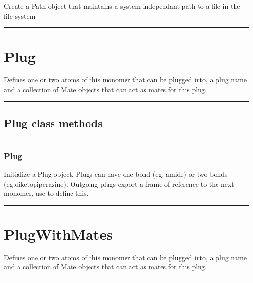 \begin{itemize}
Create a Path object that maintains a system independant path to a file in the file system.

\rule{6in}{0.01cm}\par
{}\par
\section{Plug}
Defines one or two atoms of this monomer that can be plugged into, a plug name and a
collection of Mate objects that can act as mates for this plug.

\rule{6in}{0.01cm}\par
{}\par
\subsection{Plug class methods}
\rule{6in}{0.01cm}\par
{}\par
\subsubsection{Plug}

Initialize a Plug object. Plugs can have one bond (eg: amide) or two bonds (eg:diketopiperazine).
Outgoing plugs export a frame of reference to the next monomer, use  to define this.

\rule{6in}{0.01cm}\par
{}\par
\section{PlugWithMates}
Defines one or two atoms of this monomer that can be plugged into, a plug name and a
collection of Mate objects that can act as mates for this plug.

\rule{6in}{0.01cm}\par
{}\par

\end{itemize}

